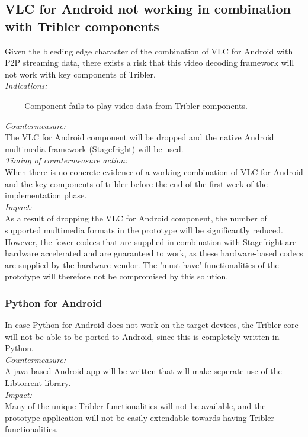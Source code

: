 \subsection{VLC for Android not working in combination with Tribler components}
Given the bleeding edge character of the combination of VLC for Android with P2P streaming data, there exists a risk that this video decoding framework will not work with key components of Tribler.\\
\newline
\textit{Indications:}
\begin{itemize}
	\item[-]Component fails to play video data from Tribler components.
\end{itemize}
\textit{Countermeasure:}\\
The VLC for Android component will be dropped and the native Android multimedia framework (Stagefright) will be used.\\
\newline
\textit{Timing of countermeasure action:}\\
When there is no concrete evidence of a working combination of VLC for Android and the key components of tribler before the end of the first week of the implementation phase.\\
\newline
\textit{Impact:}\\
As a result of dropping the VLC for Android component, the number of supported multimedia formats in the prototype will be significantly reduced. However, the fewer codecs that are supplied in combination with Stagefright are hardware accelerated and are guaranteed to work, as these hardware-based codecs are supplied by the hardware vendor. The 'must have' functionalities of the prototype will therefore not be compromised by this solution.\\ 
\subsubsection{Python for Android}
In case Python for Android does not work on the target devices, the Tribler core will not be able to be ported to Android, since this is completely written in Python.\\
\newline
\textit{Countermeasure:}\\
A java-based Android app will be written that will make seperate use of the Libtorrent library.\\
\newline
\textit{Impact:}\\
Many of the unique Tribler functionalities will not be available, and the prototype application will not be easily extendable towards having Tribler functionalities.
